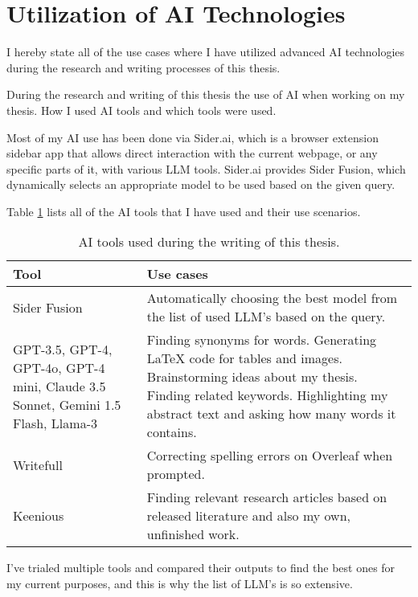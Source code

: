 



\chapter*{Utilization of AI Technologies\label{extra:declaration}}

I hereby state all of the use cases where I have utilized advanced AI technologies during the research and writing processes of this thesis.

During the research and writing of this thesis the use of AI when working on my thesis. How I used AI tools and which tools were used.

Most of my AI use has been done via Sider.ai, which is a browser extension sidebar app that allows direct interaction with the current webpage, or any specific parts of it, with various LLM tools. Sider.ai provides Sider Fusion, which dynamically selects an appropriate model to be used based on the given query.

Table \ref{table:declaration} lists all of the AI tools that I have used and their use scenarios.

\begin{table}[h]
  \centering
  \begin{tabularx}{\textwidth}{X X}
    \hline
    \textbf{Tool} & \textbf{Use cases} \\
    \hline
    Sider Fusion & Automatically choosing the best model from the list of used LLM's based on the query. \\
    \hline
    GPT-3.5, GPT-4, GPT-4o, GPT-4 mini, Claude 3.5 Sonnet, Gemini 1.5 Flash, Llama-3 & Finding synonyms for words. Generating LaTeX code for tables and images. Brainstorming ideas about my thesis. Finding related keywords. Highlighting my abstract text and asking how many words it contains.\\
    \hline
    Writefull& Correcting spelling errors on Overleaf when prompted. \\
    \hline
    Keenious & Finding relevant research articles based on released literature and also my own, unfinished work. \\
    \hline
  \end{tabularx}
  \caption{AI tools used during the writing of this thesis.}
  \label{table:declaration}
\end{table}

I've trialed multiple tools and compared their outputs to find the best ones for my current purposes, and this is why the list of LLM's is so extensive.